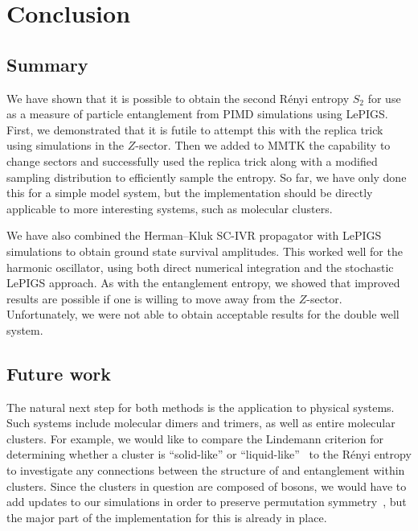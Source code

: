\chapter{Conclusion}

\label{chap:conclusion}


\section{Summary}

We have shown that it is possible to obtain the second Rényi entropy $S_2$ for use as a measure of particle entanglement from PIMD simulations using LePIGS.
First, we demonstrated that it is futile to attempt this with the replica trick using simulations in the $Z$-sector.
Then we added to MMTK the capability to change sectors and successfully used the replica trick along with a modified sampling distribution to efficiently sample the entropy.
So far, we have only done this for a simple model system, but the implementation should be directly applicable to more interesting systems, such as molecular clusters.

We have also combined the Herman--Kluk SC-IVR propagator with LePIGS simulations to obtain ground state survival amplitudes.
This worked well for the harmonic oscillator, using both direct numerical integration and the stochastic LePIGS approach.
As with the entanglement entropy, we showed that improved results are possible if one is willing to move away from the $Z$-sector.
Unfortunately, we were not able to obtain acceptable results for the double well system.


\section{Future work}

The natural next step for both methods is the application to physical systems.
Such systems include molecular dimers and trimers, as well as entire molecular clusters.
For example, we would like to compare the Lindemann criterion for determining whether a cluster is ``solid-like'' or ``liquid-like''~\cite{schmidt2014inclusion} to the Rényi entropy to investigate any connections between the structure of and entanglement within clusters.
Since the clusters in question are composed of bosons, we would have to add updates to our simulations in order to preserve permutation symmetry~\cite{herdman2014path}, but the major part of the implementation for this is already in place.


